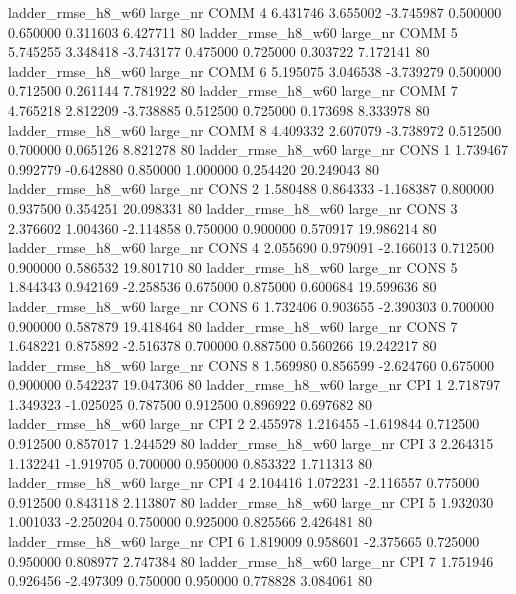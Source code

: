  ladder_rmse_h8_w60   large_nr     COMM                 4  6.431746  3.655002  -3.745987 0.500000 0.650000  0.311603    6.427711 80
 ladder_rmse_h8_w60   large_nr     COMM                 5  5.745255  3.348418  -3.743177 0.475000 0.725000  0.303722    7.172141 80
 ladder_rmse_h8_w60   large_nr     COMM                 6  5.195075  3.046538  -3.739279 0.500000 0.712500  0.261144    7.781922 80
 ladder_rmse_h8_w60   large_nr     COMM                 7  4.765218  2.812209  -3.738885 0.512500 0.725000  0.173698    8.333978 80
 ladder_rmse_h8_w60   large_nr     COMM                 8  4.409332  2.607079  -3.738972 0.512500 0.700000  0.065126    8.821278 80
 ladder_rmse_h8_w60   large_nr     CONS                 1  1.739467  0.992779  -0.642880 0.850000 1.000000  0.254420   20.249043 80
 ladder_rmse_h8_w60   large_nr     CONS                 2  1.580488  0.864333  -1.168387 0.800000 0.937500  0.354251   20.098331 80
 ladder_rmse_h8_w60   large_nr     CONS                 3  2.376602  1.004360  -2.114858 0.750000 0.900000  0.570917   19.986214 80
 ladder_rmse_h8_w60   large_nr     CONS                 4  2.055690  0.979091  -2.166013 0.712500 0.900000  0.586532   19.801710 80
 ladder_rmse_h8_w60   large_nr     CONS                 5  1.844343  0.942169  -2.258536 0.675000 0.875000  0.600684   19.599636 80
 ladder_rmse_h8_w60   large_nr     CONS                 6  1.732406  0.903655  -2.390303 0.700000 0.900000  0.587879   19.418464 80
 ladder_rmse_h8_w60   large_nr     CONS                 7  1.648221  0.875892  -2.516378 0.700000 0.887500  0.560266   19.242217 80
 ladder_rmse_h8_w60   large_nr     CONS                 8  1.569980  0.856599  -2.624760 0.675000 0.900000  0.542237   19.047306 80
 ladder_rmse_h8_w60   large_nr      CPI                 1  2.718797  1.349323  -1.025025 0.787500 0.912500  0.896922    0.697682 80
 ladder_rmse_h8_w60   large_nr      CPI                 2  2.455978  1.216455  -1.619844 0.712500 0.912500  0.857017    1.244529 80
 ladder_rmse_h8_w60   large_nr      CPI                 3  2.264315  1.132241  -1.919705 0.700000 0.950000  0.853322    1.711313 80
 ladder_rmse_h8_w60   large_nr      CPI                 4  2.104416  1.072231  -2.116557 0.775000 0.912500  0.843118    2.113807 80
 ladder_rmse_h8_w60   large_nr      CPI                 5  1.932030  1.001033  -2.250204 0.750000 0.925000  0.825566    2.426481 80
 ladder_rmse_h8_w60   large_nr      CPI                 6  1.819009  0.958601  -2.375665 0.725000 0.950000  0.808977    2.747384 80
 ladder_rmse_h8_w60   large_nr      CPI                 7  1.751946  0.926456  -2.497309 0.750000 0.950000  0.778828    3.084061 80
